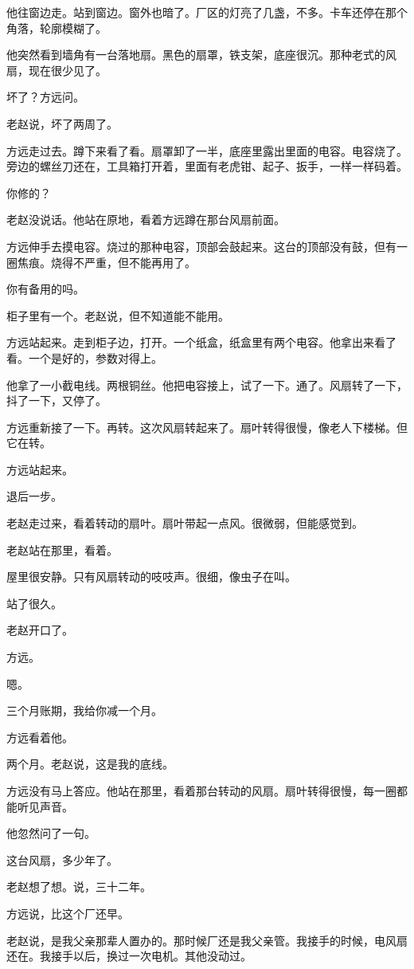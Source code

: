 \documentclass[UTF8,a5paper,11pt,openany]{ctexbook}
\begin{document}
他往窗边走。站到窗边。窗外也暗了。厂区的灯亮了几盏，不多。卡车还停在那个角落，轮廓模糊了。

他突然看到墙角有一台落地扇。黑色的扇罩，铁支架，底座很沉。那种老式的风扇，现在很少见了。

坏了？方远问。

老赵说，坏了两周了。

方远走过去。蹲下来看了看。扇罩卸了一半，底座里露出里面的电容。电容烧了。旁边的螺丝刀还在，工具箱打开着，里面有老虎钳、起子、扳手，一样一样码着。

你修的？

老赵没说话。他站在原地，看着方远蹲在那台风扇前面。

方远伸手去摸电容。烧过的那种电容，顶部会鼓起来。这台的顶部没有鼓，但有一圈焦痕。烧得不严重，但不能再用了。

你有备用的吗。

柜子里有一个。老赵说，但不知道能不能用。

方远站起来。走到柜子边，打开。一个纸盒，纸盒里有两个电容。他拿出来看了看。一个是好的，参数对得上。

他拿了一小截电线。两根铜丝。他把电容接上，试了一下。通了。风扇转了一下，抖了一下，又停了。

方远重新接了一下。再转。这次风扇转起来了。扇叶转得很慢，像老人下楼梯。但它在转。

方远站起来。

退后一步。

老赵走过来，看着转动的扇叶。扇叶带起一点风。很微弱，但能感觉到。

老赵站在那里，看着。

屋里很安静。只有风扇转动的吱吱声。很细，像虫子在叫。

站了很久。

老赵开口了。

方远。

嗯。

三个月账期，我给你减一个月。

方远看着他。

两个月。老赵说，这是我的底线。

方远没有马上答应。他站在那里，看着那台转动的风扇。扇叶转得很慢，每一圈都能听见声音。

他忽然问了一句。

这台风扇，多少年了。

老赵想了想。说，三十二年。

方远说，比这个厂还早。

老赵说，是我父亲那辈人置办的。那时候厂还是我父亲管。我接手的时候，电风扇还在。我接手以后，换过一次电机。其他没动过。
\end{document}
